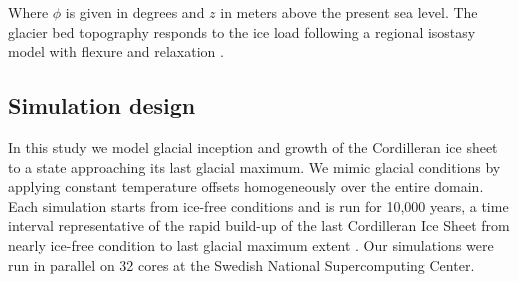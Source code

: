 Where $\phi$ is given in degrees and $z$ in meters above the present sea level. The glacier bed topography responds to the ice load following a regional isostasy model with flexure and relaxation \citep{lingle-clark-1985}.

\subsection{Simulation design}

In this study we model glacial inception and growth of the Cordilleran ice sheet to a state approaching its last glacial maximum. We mimic glacial conditions by applying constant temperature offsets homogeneously over the entire domain. Each simulation starts from ice-free conditions and is run for 10,000 years, a time interval representative of the rapid build-up of the last Cordilleran Ice Sheet from nearly ice-free condition to last glacial maximum extent \citep{clague-1989}. Our simulations were run in parallel on 32 cores at the Swedish National Supercomputing Center.

